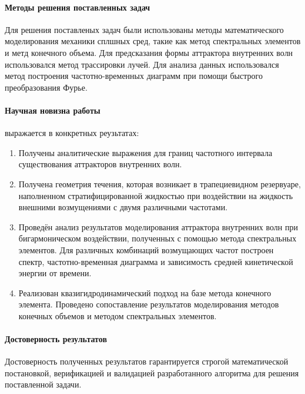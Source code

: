 \paragraph{Методы решения поставленных задач}

Для решения поставленых задач были использованы методы математического моделирования механики сплшных сред, такие как метод спектральных элементов и метд конечного объема. Для предсказания формы аттрактора внутренних волн использовался метод трассировки лучей. Для анализа данных использовался метод построения частотно-временных диаграмм при помощи быстрого преобразования Фурье.

\paragraph{Научная новизна работы} выражается в конкретных реузьтатах:
\begin{enumerate}[1.]
  \item Получены аналитические выражения для границ частотного интервала существования аттракторов внутренних волн.%
    
  \item Получена геометрия течения, которая возникает в трапециевидном резервуаре, наполненном стратифицированной жидкостью при воздействии на жидкость внешними возмущениями с двумя различными частотами. 
    
  \item Проведён анализ результатов моделирования аттрактора внутренних волн при бигармоническом воздействии, полученных с помощью метода спектральных элементов. Для различных комбинаций возмущающих частот построен спектр, частотно-временная диаграмма и зависимость средней кинетической энергии от времени. 
    
  \item Реализован квазигидродинамический подход на базе метода конечного элемента. Проведено сопоставление результатов моделирования методов конечных объемов и методом спектральных элементов.
\end{enumerate}

\paragraph{Достоверность результатов}

Достоверность полученных результатов гарантируется строгой математической постановкой, верификацией и валидацией разработанного алгоритма для решения поставленной задачи.

